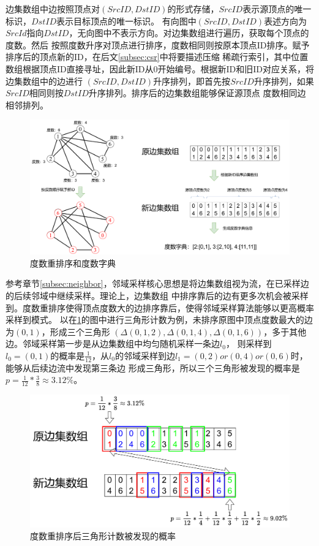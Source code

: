 \documentclass[master]{thesis-uestc}
\begin{document}
    边集数组中边按照顶点对$(SrcID,DstID)$的形式存储，$SrcID$表示源顶点的唯一标识，$DstID$表示目标顶点的唯一标识。
有向图中$(SrcID,DstID)$表述方向为$SrcId$指向$DstID$，无向图中不表示方向。对边集数组进行遍历，获取每个顶点的度数。然后
按照度数升序对顶点进行排序，度数相同则按原本顶点ID排序。赋予排序后的顶点新的ID，在后文\ref{subsec:csr}中将要描述压缩
稀疏行索引，其中位置数组根据顶点ID直接寻址，因此新ID从0开始编号。根据新ID和旧ID对应关系，将边集数组中的边进行
$(SrcID,DstID)$升序排列，即首先按$SrcID$升序排列，如果$SrcID$相同则按$DstID$升序排列。排序后的边集数组能够保证源顶点
度数相同边相邻排列。
\begin{figure}
    \includegraphics[width=\linewidth]{pic/degree_dic.pdf}
    \caption{度数重排序和度数字典}
    \label{fig:degree-dic}
\end{figure}

    参考章节\ref{subsec:neighbor}，邻域采样核心思想是将边集数组视为流，在已采样边的后续邻域中继续采样。理论上，边集数组
中排序靠后的边有更多次机会被采样到。度数重排序使得顶点度数大的边排序靠后，使得邻域采样算法能够以更高概率采样到模式。
以在\ref{fig:degree-dic}的图中进行三角形计数为例，未排序原图中顶点度数最大的边为$(0,1)$，形成三个三角形
$(\Delta(0,1,2),\Delta(0,1,4),\Delta(0,1,6))$，多于其他边。邻域采样第一步是从边集数组中均匀随机采样一条边$l_0$，
则采样到$l_0=(0,1)$的概率是$\frac{1}{12}$，从$l_0$的邻域采样到边$l_1=(0,2) or (0,4) or (0,6)$时，能够从后续边流中发现第三条边
形成三角形，所以三个三角形被发现的概率是$p=\frac{1}{12}*\frac{3}{8}\approx3.12\%$。

\begin{figure}
    \includegraphics[width=\linewidth]{pic/reorder_pro.pdf}
    \caption{度数重排序后三角形计数被发现的概率}
    \label{fig:reorder_pro}
\end{figure}
    
\end{document}
